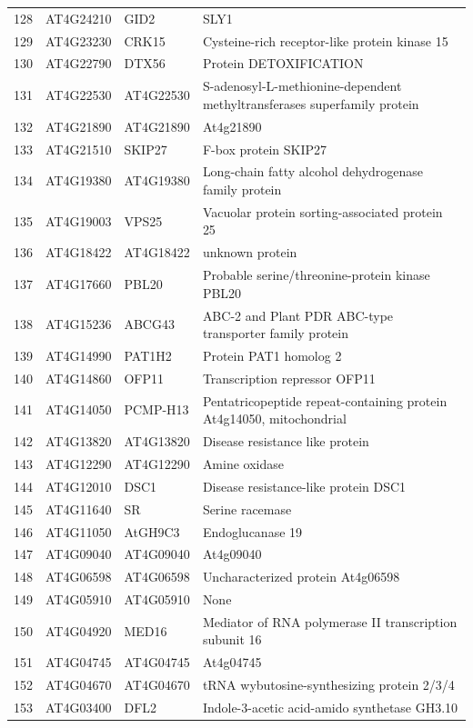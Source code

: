 \documentclass[11pt]{article}
\begin{document}
\begin{center}
\begin{tabular}{rlll}
128 & AT4G24210 & GID2 & SLY1\\
129 & AT4G23230 & CRK15 & Cysteine-rich receptor-like protein kinase 15\\
130 & AT4G22790 & DTX56 & Protein DETOXIFICATION\\
131 & AT4G22530 & AT4G22530 & S-adenosyl-L-methionine-dependent methyltransferases superfamily protein\\
132 & AT4G21890 & AT4G21890 & At4g21890\\
133 & AT4G21510 & SKIP27 & F-box protein SKIP27\\
134 & AT4G19380 & AT4G19380 & Long-chain fatty alcohol dehydrogenase family protein\\
135 & AT4G19003 & VPS25 & Vacuolar protein sorting-associated protein 25\\
136 & AT4G18422 & AT4G18422 & unknown protein\\
137 & AT4G17660 & PBL20 & Probable serine/threonine-protein kinase PBL20\\
138 & AT4G15236 & ABCG43 & ABC-2 and Plant PDR ABC-type transporter family protein\\
139 & AT4G14990 & PAT1H2 & Protein PAT1 homolog 2\\
140 & AT4G14860 & OFP11 & Transcription repressor OFP11\\
141 & AT4G14050 & PCMP-H13 & Pentatricopeptide repeat-containing protein At4g14050, mitochondrial\\
142 & AT4G13820 & AT4G13820 & Disease resistance like protein\\
143 & AT4G12290 & AT4G12290 & Amine oxidase\\
144 & AT4G12010 & DSC1 & Disease resistance-like protein DSC1\\
145 & AT4G11640 & SR & Serine racemase\\
146 & AT4G11050 & AtGH9C3 & Endoglucanase 19\\
147 & AT4G09040 & AT4G09040 & At4g09040\\
148 & AT4G06598 & AT4G06598 & Uncharacterized protein At4g06598\\
149 & AT4G05910 & AT4G05910 & None\\
150 & AT4G04920 & MED16 & Mediator of RNA polymerase II transcription subunit 16\\
151 & AT4G04745 & AT4G04745 & At4g04745\\
152 & AT4G04670 & AT4G04670 & tRNA wybutosine-synthesizing protein 2/3/4\\
153 & AT4G03400 & DFL2 & Indole-3-acetic acid-amido synthetase GH3.10\\

\end{tabular}
\end{center}
\end{document}

